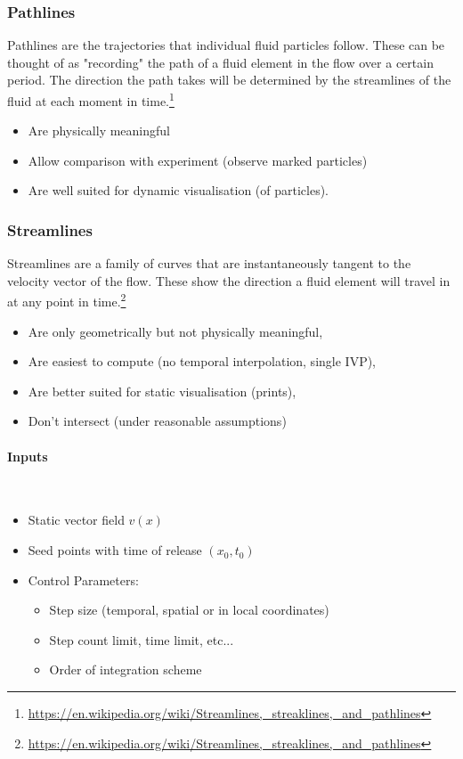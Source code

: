 \subsubsection{Pathlines}
Pathlines are the trajectories that individual fluid particles follow. These can be thought of as "recording" the path of a fluid element in the flow over a certain period. The direction the path takes will be determined by the streamlines of the fluid at each moment in time.\footnote{\url{https://en.wikipedia.org/wiki/Streamlines,_streaklines,_and_pathlines}}

\begin{itemize}
    \item Are physically meaningful
    \item Allow comparison with experiment (observe marked particles)
    \item Are well suited for dynamic visualisation (of particles).
\end{itemize}


\subsubsection{Streamlines}
Streamlines are a family of curves that are instantaneously tangent to the velocity vector of the flow. These show the direction a fluid element will travel in at any point in time.\footnote{\url{https://en.wikipedia.org/wiki/Streamlines,_streaklines,_and_pathlines}}
\begin{itemize}
    \item Are only geometrically but not physically meaningful,
    \item Are easiest to compute (no temporal interpolation, single IVP),
    \item Are better suited for static visualisation (prints),
    \item Don't intersect (under reasonable assumptions)
\end{itemize}

\paragraph{Inputs} $\ $
\begin{itemize}
    \item Static vector field $v(x)$
    \item Seed points with time of release $(x_0, t_0)$
    \item Control Parameters:
        \begin{itemize}
            \item Step size (temporal, spatial or in local coordinates)
            \item Step count limit, time limit, etc...
            \item Order of integration scheme
        \end{itemize}
\end{itemize}
